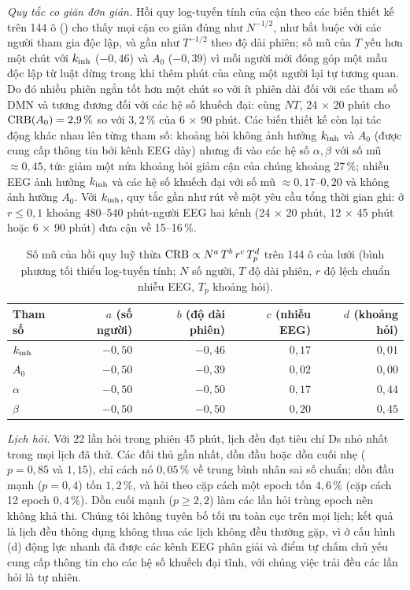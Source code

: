 \emph{Quy tắc co giãn đơn giản.} Hồi quy log-tuyến tính của cận theo các biến thiết kế trên 144 ô () cho thấy mọi cận co giãn đúng như $N^{-1/2}$, như bắt buộc với các người tham gia độc lập, và gần như $T^{-1/2}$ theo độ dài phiên; số mũ của $T$ yếu hơn một chút với $k_{\mathrm{inh}}$ ($-0{,}46$) và $A_0$ ($-0{,}39$) vì mỗi người mới đóng góp một mẫu độc lập từ luật dừng trong khi thêm phút của cùng một người lại tự tương quan. Do đó nhiều phiên ngắn tốt hơn một chút so với ít phiên dài đối với các tham số DMN và tương đương đối với các hệ số khuếch đại: cùng $NT$, 24 $\times$ 20 phút cho $\mathrm{CRB}(A_0)=2{,}9\,\%$ so với $3{,}2\,\%$ của 6 $\times$ 90 phút. Các biến thiết kế còn lại tác động khác nhau lên từng tham số: khoảng hỏi không ảnh hưởng $k_{\mathrm{inh}}$ và $A_0$ (được cung cấp thông tin bởi kênh EEG dày) nhưng đi vào các hệ số $\alpha,\beta$ với số mũ $\approx0{,}45$, tức giảm một nửa khoảng hỏi giảm cận của chúng khoảng 27\,\%; nhiễu EEG ảnh hưởng $k_{\mathrm{inh}}$ và các hệ số khuếch đại với số mũ $\approx0{,}17$--$0{,}20$ và không ảnh hưởng $A_0$. Với $k_{\mathrm{inh}}$, quy tắc gần như rút về một yêu cầu tổng thời gian ghi: ở $r\le0{,}1$ khoảng $480$--$540$ phút-người EEG hai kênh (24 $\times$ 20 phút, 12 $\times$ 45 phút hoặc 6 $\times$ 90 phút) đưa cận về 15--16\,\%.

\begin{table}[t]
\centering\small
\caption{Số mũ của hồi quy luỹ thừa $\mathrm{CRB}\propto N^{a}\,T^{b}\,r^{c}\,T_p^{d}$ trên 144 ô của lưới (bình phương tối thiểu log-tuyến tính; $N$ số người, $T$ độ dài phiên, $r$ độ lệch chuẩn nhiễu EEG, $T_p$ khoảng hỏi).}
\label{tab:scaling}
\begin{tabular}{lrrrr}
\toprule
Tham số & $a$ (số người) & $b$ (độ dài phiên) & $c$ (nhiễu EEG) & $d$ (khoảng hỏi) \\
\midrule
$k_{\mathrm{inh}}$  & $-0{,}50$ & $-0{,}46$ & $0{,}17$ & $0{,}01$ \\
$A_0$    & $-0{,}50$ & $-0{,}39$ & $0{,}02$ & $0{,}00$ \\
$\alpha$ & $-0{,}50$ & $-0{,}50$ & $0{,}17$ & $0{,}44$ \\
$\beta$  & $-0{,}50$ & $-0{,}50$ & $0{,}20$ & $0{,}45$ \\
\bottomrule
\end{tabular}
\end{table}

\emph{Lịch hỏi.} Với 22 lần hỏi trong phiên 45 phút, lịch đều đạt tiêu chí Ds nhỏ nhất trong mọi lịch đã thử. Các đối thủ gần nhất, dồn đầu hoặc dồn cuối nhẹ ($p=0{,}85$ và $1{,}15$), chỉ cách nó $0{,}05\,\%$ về trung bình nhân sai số chuẩn; dồn đầu mạnh ($p=0{,}4$) tốn $1{,}2\,\%$, và hỏi theo cặp cách một epoch tốn $4{,}6\,\%$ (cặp cách 12 epoch $0{,}4\,\%$). Dồn cuối mạnh ($p\ge2{,}2$) làm các lần hỏi trùng epoch nên không khả thi. Chúng tôi không tuyên bố tối ưu toàn cục trên mọi lịch; kết quả là lịch đều thông dụng không thua các lịch không đều thường gặp, vì ở cấu hình (d) động lực nhanh đã được các kênh EEG phân giải và điểm tự chấm chủ yếu cung cấp thông tin cho các hệ số khuếch đại tĩnh, với chúng việc trải đều các lần hỏi là tự nhiên.

